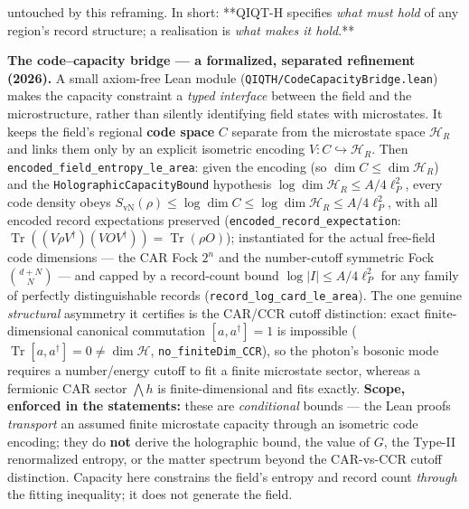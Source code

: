 \documentclass[11pt,a4paper]{article}
\begin{document}
untouched by this reframing. In short: **QIQT-H specifies \emph{what must hold} of any region's record structure; a realisation is \emph{what makes it hold}.**

\textbf{The code–capacity bridge — a formalized, separated refinement (2026).} A small axiom-free Lean module (\texttt{QIQTH/CodeCapacityBridge.lean}) makes the capacity constraint a \emph{typed interface} between the field and the microstructure, rather than silently identifying field states with microstates. It keeps the field's regional \textbf{code space} $C$ separate from the microstate space $\mathcal{H}_R$ and links them only by an explicit isometric encoding $V:C\hookrightarrow\mathcal{H}_R$. Then \texttt{encoded\_field\_entropy\_le\_area}: given the encoding (so $\dim C \le \dim\mathcal{H}_R$) and the \texttt{HolographicCapacityBound} hypothesis $\log\dim\mathcal{H}_R \le A/4\ell_P^2$, every code density obeys $S_{\mathrm{vN}}(\rho) \le \log\dim C \le \log\dim\mathcal{H}_R \le A/4\ell_P^2$, with all encoded record expectations preserved (\texttt{encoded\_record\_expectation}: $\operatorname{Tr}((V\rho V^\dagger)(VOV^\dagger))=\operatorname{Tr}(\rho O)$); instantiated for the actual free-field code dimensions — the CAR Fock $2^n$ and the number-cutoff symmetric Fock $\binom{d+N}{N}$ — and capped by a record-count bound $\log|I|\le A/4\ell_P^2$ for any family of perfectly distinguishable records (\texttt{record\_log\_card\_le\_area}). The one genuine \emph{structural} asymmetry it certifies is the CAR/CCR cutoff distinction: exact finite-dimensional canonical commutation $[a,a^\dagger]=1$ is impossible ($\operatorname{Tr}[a,a^\dagger]=0\ne\dim\mathcal{H}$, \texttt{no\_finiteDim\_CCR}), so the photon's bosonic mode requires a number/energy cutoff to fit a finite microstate sector, whereas a fermionic CAR sector $\bigwedge h$ is finite-dimensional and fits exactly. \textbf{Scope, enforced in the statements:} these are \emph{conditional} bounds — the Lean proofs \emph{transport} an assumed finite microstate capacity through an isometric code encoding; they do \textbf{not} derive the holographic bound, the value of $G$, the Type-II renormalized entropy, or the matter spectrum beyond the CAR-vs-CCR cutoff distinction. Capacity here constrains the field's entropy and record count \emph{through} the fitting inequality; it does not generate the field.
\end{document}
